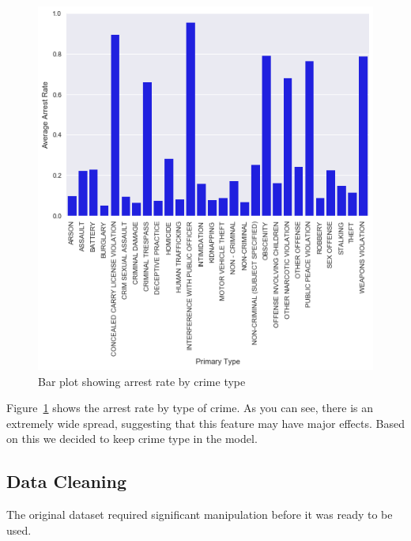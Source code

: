 \documentclass[10pt]{SelfArx} %
\begin{document}
    \begin{figure}[h]
      \includegraphics[width=\linewidth]{FinalVisualizations/primarytypes.png}
      \caption{Bar plot showing arrest rate by crime type}
      \label{fig:primarytype}
    \end{figure}

    Figure~\ref{fig:primarytype} shows the arrest rate by type of crime. As you
    can see, there is an extremely wide spread, suggesting that this feature
    may have major effects. Based on this we decided to keep crime type in the
    model.

    \subsection{Data Cleaning}
    The original dataset required significant manipulation before it was ready to be used.
\end{document}

